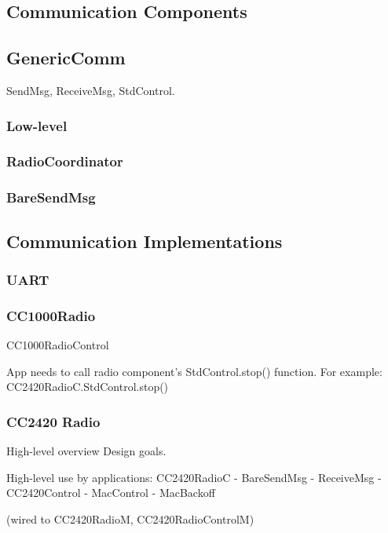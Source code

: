 \subsection{Communication Components}

\subsection{GenericComm}

SendMsg, ReceiveMsg, StdControl. 

\subsubsection{Low-level}
\subsubsection{RadioCoordinator}
\subsubsection{BareSendMsg}

\subsection{Communication Implementations}
\subsubsection{UART}

\subsubsection{CC1000Radio}

CC1000RadioControl


App needs to call radio component's StdControl.stop() function. For
  example: CC2420RadioC.StdControl.stop()

\subsubsection{CC2420 Radio}

High-level overview
Design goals.

High-level use by applications:
CC2420RadioC 
  - BareSendMsg
  - ReceiveMsg
  - CC2420Control
  - MacControl
  - MacBackoff

(wired  to CC2420RadioM, CC2420RadioControlM)

